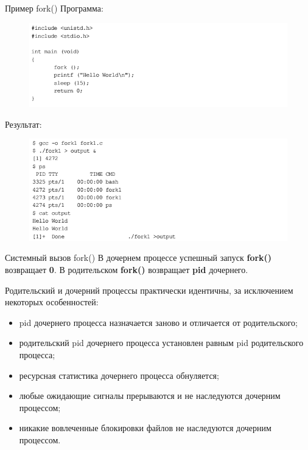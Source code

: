 \documentclass{beamer}
\begin{document}
\begin{frame}{Пример fork()}
Программа:
\begin{figure}[h]
\centering
\includegraphics[scale=0.5]{images/lec07-pic31.png}
\end{figure}
Результат:
\begin{figure}[h]
\centering
\includegraphics[scale=0.4]{images/lec07-pic32.png}
\end{figure}
\end{frame}

\begin{frame}{Системный вызов fork()}
В дочернем процессе успешный запуск \textbf{fork()} возвращает \textbf{0}. В родительском \textbf{fork()} возвращает \textbf{pid} дочернего. 

Родительский и дочерний процессы практически идентичны, за исключением некоторых особенностей:
\begin{itemize}
\item pid дочернего процесса назначается заново и отличается от родительского;
\item родительский pid дочернего процесса установлен равным pid родительского
процесса;
\item ресурсная статистика дочернего процесса обнуляется;
\item любые ожидающие сигналы прерываются и не наследуются дочерним процессом;
\item никакие вовлеченные блокировки файлов не наследуются дочерним процессом.
\end{itemize}
\end{frame}
\end{document}
